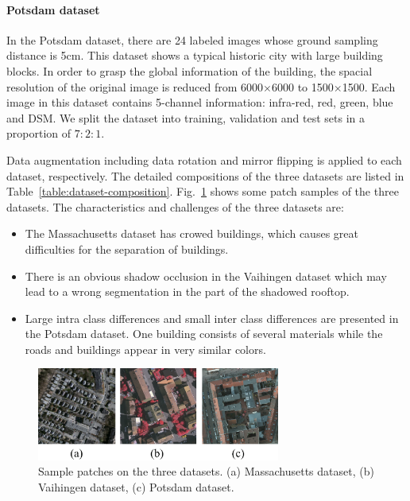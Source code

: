 \paragraph{Potsdam dataset}
%
In the Potsdam dataset, there are 24 labeled images whose ground sampling distance is 5cm.
This dataset shows a typical historic city with large building blocks. In order to grasp the global information of the building, the spacial resolution of the original image is reduced from 6000$\times$6000 to 1500$\times$1500.
Each image in this dataset contains 5-channel information: infra-red, red, green, blue and DSM.
We split the dataset into training, validation and test sets in a proportion of $7:2:1$.



Data augmentation including data rotation and mirror flipping is applied to each dataset, respectively.
The detailed compositions of the three datasets are listed in Table~\ref{table:dataset-composition}.
Fig.~\ref{fig:dataset_sample} shows some patch samples of the three datasets.
The characteristics and challenges of the three datasets are:
\begin{itemize}
 \item The Massachusetts dataset has crowed buildings, which causes great difficulties for the separation of buildings.
 \item There is an obvious shadow occlusion in the Vaihingen dataset which may lead to a wrong segmentation in the part of the shadowed rooftop.
 \item Large intra class differences and small inter class differences are presented in the Potsdam dataset. One building consists of several materials while the roads and buildings appear in very similar colors.
\end{itemize}


\begin{figure}
\centering
\includegraphics[width=8cm]{Figures/datasets.eps}
\caption{Sample patches on the three datasets. (a) Massachusetts dataset, (b) Vaihingen dataset, (c) Potsdam dataset.}
\label{fig:dataset_sample}
\end{figure}

